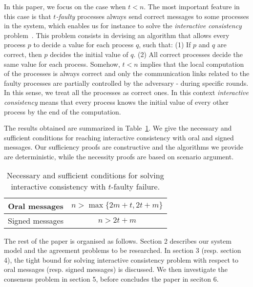 \documentclass[11pt]{article}
\newcommand{\tmem}[1]{{\em #1\/}}
\begin{document}
In this paper, we focus on the case when $t<n$.
The most important feature in this case is that {\tmem{$t$-faulty}}
processes always send correct messages to some processes in the system,
which enables us for instance to solve the \tmem{interactive consistency} problem~\cite{fischer1983consensus}. This problem consists in devising an algorithm
that allows every process $p$ to decide a value for each process $q$,
such that: (1) If $p$ and $q$ are correct, then $p$ decides the
initial value of $q$. (2) All correct processes decide the same
value for each process. Somehow, $t<n$ implies that the local
computation of the processes is always correct and only the
communication links related to the faulty processes are partially
controlled by the adversary - during specific rounds.
In this sense, we treat all the processes as
correct ones. In this context {\tmem{interactive consistency}}
means that every process knows the initial value of every other
process by the end of the computation.

The results obtained are summarized in
Table~\ref{tab:results}. We give the necessary and sufficient
conditions for reaching interactive consistency with oral and signed
messages. Our sufficiency proofs are constructive and the algorithms
we provide are deterministic, while the necessity proofs are based on
scenario argument.


\begin{table}[h]
\centering
\begin{tabular}{|c|c|}
\hline
Oral messages & $n> \max \{ 2m+t,2t+m \}$\\
\hline
Signed messages & $n>2t+m$\\
\hline
\end{tabular}
\caption{\label{tab:results}Necessary and sufficient conditions for solving
interactive consistency with $t$-faulty failure.}
\end{table}

The rest of the paper is organised as follows. Section 2 describes our system model and the agreement problems to be researched. In section 3 (resp. section 4), the tight bound for solving interactive consistency problem with respect to oral messages (resp. signed messages) is discussed. We then investigate the consensus problem in section 5, before concludes the paper in seciton 6.











\newpage




\newpage
\appendix

\end{document}

